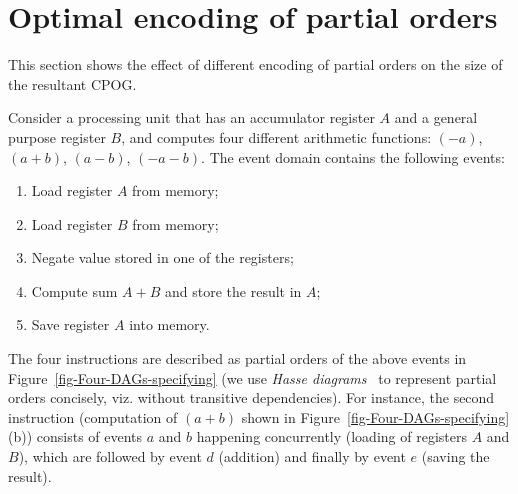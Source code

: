 \section{Optimal encoding of partial orders\label{sec:Optimal-encoding-problem}}

This section shows the effect of different encoding of partial orders
on the size of the resultant CPOG.

Consider a processing unit that has an accumulator register $A$ and
a general purpose register $B$, and computes four different arithmetic
functions: $(-a)$, $(a+b)$, $(a-b)$, $(-a-b)$. The event domain
contains the following events:

\renewcommand{\labelenumi}{\alph{enumi})}
\begin{enumerate}
\item Load register $A$ from memory;
\item Load register $B$ from memory;
\item Negate value stored in one of the registers;
\item Compute sum $A+B$ and store the result in $A$;
\item Save register $A$ into memory.
\end{enumerate}
The four instructions are described as partial orders of the above
events in Figure~\ref{fig-Four-DAGs-specifying} (we use \emph{Hasse
diagrams}~\cite{1967_birkhoff_} to represent partial orders concisely,
viz. without transitive dependencies). For instance, the second instruction
(computation of $(a+b)$ shown in Figure~\ref{fig-Four-DAGs-specifying}(b))
consists of events $a$ and $b$ happening concurrently (loading of
registers $A$ and $B$), which are followed by event $d$ (addition)
and finally by event $e$ (saving the result).

